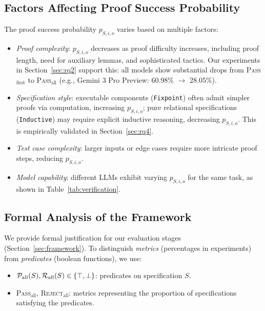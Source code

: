 \subsection{Factors Affecting Proof Success Probability}

The proof success probability $p_{S,i,o}$ varies based on multiple factors:
\begin{itemize}[leftmargin=1.5em, itemsep=4pt, topsep=4pt]
    \item \emph{Proof complexity}: $p_{S,i,o}$ decreases as proof difficulty increases, including proof length, need for auxiliary lemmas, and sophisticated tactics. Our experiments in Section~\ref{sec:rq2} support this: all models show substantial drops from \textsc{Pass}$_{\text
    {first}}$ to \textsc{Pass}$_{\text{all}}$ (e.g., Gemini 3 Pro Preview: 60.98\% $\to$ 28.05\%).
    \item \emph{Specification style}: executable components (\texttt{Fixpoint}) often admit simpler proofs via computation, increasing $p_{S,i,o}$; pure relational specifications (\texttt{Inductive}) may require explicit inductive reasoning, decreasing $p_{S,i,o}$. This is empirically validated in Section~\ref{sec:rq4}.
    \item \emph{Test case complexity}: larger inputs or edge cases require more intricate proof steps, reducing $p_{S,i,o}$.
    \item \emph{Model capability}: different LLMs exhibit varying $p_{S,i,o}$ for the same task, as shown in Table~\ref{tab:verification}.
\end{itemize}

\subsection{Formal Analysis of the \ours{} Framework}

We provide formal justification for our evaluation stages (Section~\ref{sec:framework}). To distinguish \emph{metrics} (percentages in experiments) from \emph{predicates} (boolean functions), we use:
\begin{itemize}[leftmargin=1.5em, itemsep=2pt, topsep=2pt]
    \item $\mathcal{P}_{\text{all}}(S), \mathcal{R}_{\text{all}}(S) \in \{\top, \bot\}$: predicates on specification $S$.
    \item \textsc{Pass}$_{\text{all}}$, \textsc{Reject}$_{\text{all}}$: metrics representing the proportion of specifications satisfying the predicates.
\end{itemize}

